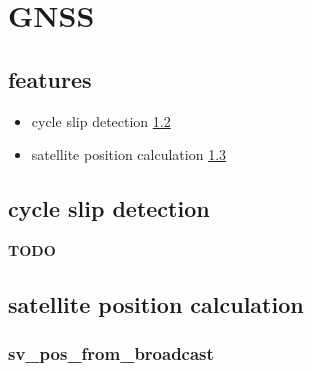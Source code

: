 \documentclass[9pt,a4paper,onecolumn,oneside]{rho-class/rho}
\begin{document}
\section{GNSS}

\subsection{features}
\begin{itemize}
    \item cycle slip detection \ref{sec:cycle slip detection}
    \item satellite position calculation \ref{sec:satellite position calculation}
\end{itemize}

\subsection{cycle slip detection}\label{sec:cycle slip detection}
\textbf{TODO}

\subsection{satellite position calculation}\label{sec:satellite position calculation}

\subsubsection{sv\_pos\_from\_broadcast}\label{func:sv_pos_from_broadcast}
\end{document}
